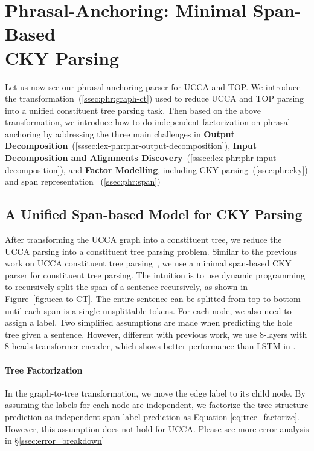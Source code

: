 \section[Phrasal-Anchoring: Minimal Span-based CKY Parsing]{Phrasal-Anchoring: Minimal Span-Based \\CKY Parsing}
\label{sec:lex-phr:cky-based}

Let us now see our phrasal-anchoring parser for UCCA and TOP. We
introduce the transformation~(\autoref{ssec:phr:graph-ct}) used to
reduce UCCA and TOP parsing into a unified constituent tree parsing
task. Then based on the above transformation, we introduce how to do
independent factorization on phrasal-anchoring by addressing the three
main challenges in \textbf{Output
  Decomposition}~(\autoref{sssec:lex-phr:phr-output-decomposition}),
\textbf{Input Decomposition and Alignments
  Discovery}~(\autoref{sssec:lex-phr:phr-input-decomposition}), and
\textbf{Factor Modelling}, including CKY
parsing~(\autoref{ssec:phr:cky}) and span representation
~(\autoref{ssec:phr:span})





\subsection{A Unified Span-based Model for CKY Parsing}
\label{ssec:phr:cky}
After transforming the UCCA graph into a constituent tree, we reduce
the UCCA parsing into a constituent tree parsing problem. Similar to
the previous work on UCCA constituent tree
parsing~\cite{jiang2019hlt}, we use a minimal span-based CKY parser
for constituent tree parsing.  The intuition is to use dynamic
programming to recursively split the span of a sentence recursively,
as shown in Figure~\ref{fig:ucca-to-CT}. The entire sentence can be
splitted from top to bottom until each span is a single unsplittable
tokens. For each node, we also need to assign a label. Two simplified
assumptions are made when predicting the hole tree given a
sentence. However, different with previous work, we use 8-layers with
8 heads transformer encoder, which shows better performance than LSTM
in \citet{kitaev2018constituency}.

\paragraph{Tree Factorization} In the graph-to-tree transformation, we
move the edge label to its child node. By assuming the labels for each
node are independent, we factorize the tree structure prediction as
independent span-label prediction as Equation
\ref{eq:tree_factorize}. However, this assumption does not hold for UCCA.
Please see more error analysis in \S \ref{ssec:error_breakdown}

